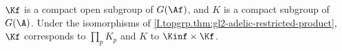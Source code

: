 $\Kf$ is a compact open subgroup of $G(\Af)$, and $K$ is a compact subgroup of $G(\A)$. Under the isomorphisms of
\cref{I.topgrp.thm:gl2-adelic-restricted-product}, $\Kf$ corresponds to $\prod_pK_p$ and $K$ to $\Kinf\times\Kf$.
